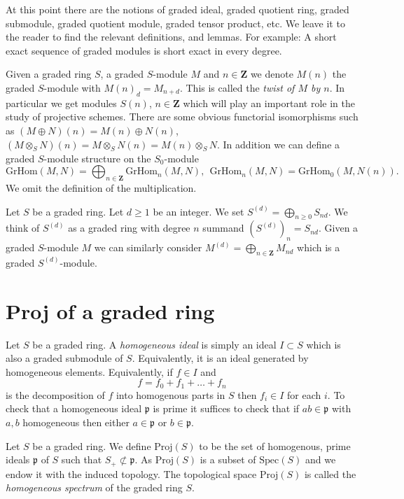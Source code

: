 \medskip\noindent
At this point there are the notions of graded ideal,
graded quotient ring, graded submodule, graded quotient module,
graded tensor product, etc. We leave it to the reader to find the
relevant definitions, and lemmas. For example: A short exact sequence
of graded modules is short exact in every degree.

\medskip\noindent
Given a graded ring $S$, a graded $S$-module $M$ and $n \in \mathbf{Z}$
we denote $M(n)$ the graded $S$-module with $M(n)_d = M_{n + d}$.
This is called the {\it twist of $M$ by $n$}. In particular we get
modules $S(n)$, $n \in \mathbf{Z}$ which will play an important
role in the study of projective schemes. There are some obvious
functorial isomorphisms such as
$(M \oplus N)(n) = M(n) \oplus N(n)$,
$(M \otimes_S N)(n) = M \otimes_S N(n) = M(n) \otimes_S N$.
In addition we can define a graded $S$-module structure on
the $S_0$-module
$$
\text{GrHom}(M, N) =
\bigoplus\nolimits_{n \in \mathbf{Z}} \text{GrHom}_n(M, N), \ \ 
\text{GrHom}_n(M, N) = \text{GrHom}_0(M, N(n)).
$$
We omit the definition of the multiplication.

\medskip\noindent
Let $S$ be a graded ring. Let $d \geq 1$ be an integer.
We set $S^{(d)} = \bigoplus_{n \geq 0} S_{nd}$. We think of
$S^{(d)}$ as a graded ring with degree $n$ summand
$(S^{(d)})_n = S_{nd}$. Given a graded $S$-module $M$ we
can similarly consider $M^{(d)} = \bigoplus_{n \in \mathbf{Z}} M_{nd}$
which is a graded $S^{(d)}$-module.









\section{Proj of a graded ring}
\label{section-proj}

\noindent
Let $S$ be a graded ring.
A {\it homogeneous ideal} is simply an ideal
$I \subset S$ which is also a graded submodule of $S$.
Equivalently, it is an ideal generated by homogeneous elements.
Equivalently, if $f \in I$ and
$$
f = f_0 + f_1 + \ldots + f_n
$$
is the decomposition of $f$ into homogenous parts in $S$ then $f_i \in I$
for each $i$. To check that a homogeneous ideal $\mathfrak p$
is prime it suffices to check that if $ab \in \mathfrak p$
with $a, b$ homogeneous then either $a \in \mathfrak p$ or
$b \in \mathfrak p$.

\begin{definition}
\label{definition-proj}
Let $S$ be a graded ring.
We define $\text{Proj}(S)$ to be the set of homogenous,
prime ideals $\mathfrak p$ of $S$ such that
$S_{+} \not \subset \mathfrak p$.
As $\text{Proj}(S)$ is a subset of $\text{Spec}(S)$
and we endow it with the induced topology.
The topological space $\text{Proj}(S)$ is called the
{\it homogeneous spectrum} of the graded ring $S$.
\end{definition}

